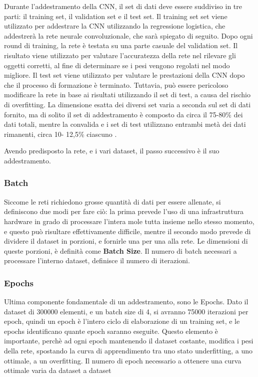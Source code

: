 \documentclass[14pt]{extarticle}
\begin{document}
Durante l'addestramento della CNN, il set di dati deve essere suddiviso in tre parti:
il training set, il validation set e il test set. Il training set
set viene utilizzato per addestrare la CNN utilizzando la regressione logistica, che addestrerà la rete neurale convoluzionale, che sarà spiegato di seguito. Dopo ogni round di training, la rete è
testata su una parte casuale del validation set. Il risultato viene utilizzato per valutare l'accuratezza della rete nel rilevare gli oggetti corretti,
al fine di determinare se i pesi vengono regolati nel modo migliore.
Il test set viene utilizzato per valutare le prestazioni della CNN dopo che
il processo di formazione è terminato. Tuttavia, può essere pericoloso modificare
la rete in base ai risultati utilizzando il set di test, a causa del rischio
di overfitting. La dimensione esatta dei diversi set varia a seconda
sul set di dati fornito, ma di solito il set di addestramento è composto da
circa il 75-80\% dei dati totali, mentre la convalida e
i set di test utilizzano entrambi metà dei dati rimanenti, circa 10-
12,5\% ciascuno \cite{guyon1997scaling}.

Avendo predisposto la rete, e i vari dataset, il passo successivo è il suo addestramento.

\subsubsection{Batch}
Siccome le reti richiedono grosse quantità di dati per essere allenate, si definiscono due modi per fare ciò: la prima prevede l'uso di una infrastruttura hardware in grado di processare l'intera mole tutta insieme nello stesso momento, e questo può risultare effettivamente difficile, mentre il secondo modo prevede di dividere il dataset in porzioni, e fornirle una per una alla rete.
Le dimensioni di queste porzioni, è definità come \textbf{Batch Size}.
Il numero di batch  necessari a processare l'interno dataset, definisce il numero di iterazioni.

\subsubsection{Epochs}
Ultima componente fondamentale di un addestramento, sono le Epochs.
Dato il dataset di 300000 elementi, e un batch size di 4, si avranno 75000 iterazioni per epoch, quindi un epoch è l'intero ciclo di elaborazione di un training set, e le epochs identificano quante epoch saranno eseguite. Questo elemento è importante, perchè ad ogni epoch mantenendo il dataset costante, modifica i pesi della rete, spostando la curva di apprendimento tra uno stato underfitting, a uno ottimale, a un overfitting. 
Il numero di epoch necessario a ottenere una curva ottimale varia da dataset a dataset
\end{document}
